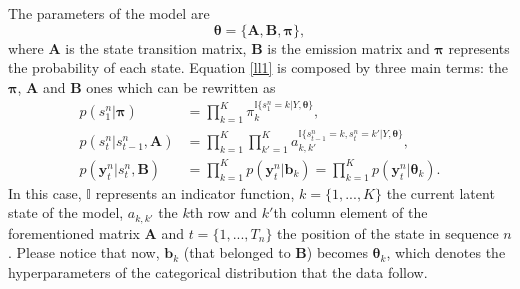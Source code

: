 \documentclass[12pt]{article}
\newcommand{\indicator}{\mathbb{I}}
\begin{document}
\noindent The parameters of the model are
\begin{equation}
\boldsymbol\theta = \{ \mathbf { A } , \mathbf { B } , \boldsymbol\pi \},
\end{equation}
where $\mathbf { A }$  is the state transition matrix, $\mathbf { B } $ is the emission matrix and  $\boldsymbol\pi $ represents the probability of each state.
Equation \ref{ll1} is composed by three main terms: the $\boldsymbol\pi$, $\mathbf { A }$ and $\mathbf { B } $ ones which can be rewritten as
\begin{align}
p \left( s _ { 1 } ^ { n } | \boldsymbol\pi \right) &= \prod\limits_{k=1}^{K}\pi_{k}^{\indicator \lbrace s_{1}^{n}=k|Y,\boldsymbol\theta\rbrace},\\
p \left( s _ { t } ^ { n } | s _ { t - 1 } ^ { n } , \mathbf { A } \right) &= \prod\limits_{k=1}^{K} \prod\limits_{k'=1}^{K}a_{k,k'}^{\indicator \lbrace s_{t-1}^{n}=k,s_{t}^{n}=k'|Y,\boldsymbol\theta\rbrace},\\
p \left( \mathbf { y } _ { t } ^ { n } | s _ { t } ^ { n } , \mathbf { B } \right) &= \prod\limits_{k=1}^{K} p \left( \mathbf { y } _ { t } ^ { n } | \boldsymbol b_{k} \right) = \prod\limits_{k=1}^{K} p \left( \mathbf { y } _ { t } ^ { n } | \boldsymbol\theta_{k} \right) \label{p3LL}.
\end{align}
In this case, $\indicator$ represents an indicator function, $k = \lbrace{1,...,K}\rbrace$ the current latent state of the model, $a_{k,k'}$ the $k$th row and $k'$th column element of the forementioned matrix $\mathbf { A }$ and $t = \lbrace{1,...,T_{n}}\rbrace$ the position of the state in sequence $n$. Please notice that now, $\mathbf{b}_{k}$ (that belonged to $\mathbf{B}$) becomes $\boldsymbol\theta_{k}$, which denotes the hyperparameters of the categorical distribution that the data follow.\\
\end{document}
